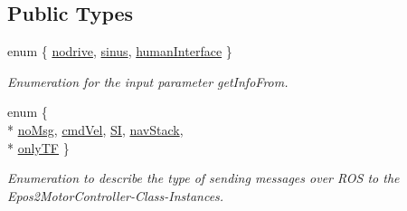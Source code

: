 \subsection*{Public Types}
\begin{DoxyCompactItemize}
\item 
enum \{ \hyperlink{classSampleMoving_a41123bbf6a4408e82424c92a414fa524a7c0a083c39ec97797c0b28909fa3474b}{nodrive}, 
\hyperlink{classSampleMoving_a41123bbf6a4408e82424c92a414fa524a40b19ec7388083907df9c6d5284e89cd}{sinus}, 
\hyperlink{classSampleMoving_a41123bbf6a4408e82424c92a414fa524a965c7cf26ddac600016e6d8e003bb70c}{human\-Interface}
 \}
\begin{DoxyCompactList}\small\item\em Enumeration for the input parameter get\-Info\-From. \end{DoxyCompactList}\item 
enum \{ \\*
\hyperlink{classSampleMoving_a68852e46a4c2887978990a7dd92bc66eafa273e9ac9cc895eb7a6cb70f55ff19c}{no\-Msg}, 
\hyperlink{classSampleMoving_a68852e46a4c2887978990a7dd92bc66ea06732e1094ab62068d0edca312788d5c}{cmd\-Vel}, 
\hyperlink{classSampleMoving_a68852e46a4c2887978990a7dd92bc66ea4875b4f467dbf540a6bf9f93b182fcd2}{S\-I}, 
\hyperlink{classSampleMoving_a68852e46a4c2887978990a7dd92bc66ea1e92f96bda560fb7a34fdb799c795834}{nav\-Stack}, 
\\*
\hyperlink{classSampleMoving_a68852e46a4c2887978990a7dd92bc66ea4b7bd49d49b96a78a07ed55aecbb39cd}{only\-T\-F}
 \}
\begin{DoxyCompactList}\small\item\em Enumeration to describe the type of sending messages over R\-O\-S to the Epos2\-Motor\-Controller-\/\-Class-\/\-Instances. \end{DoxyCompactList}\end{DoxyCompactItemize}
